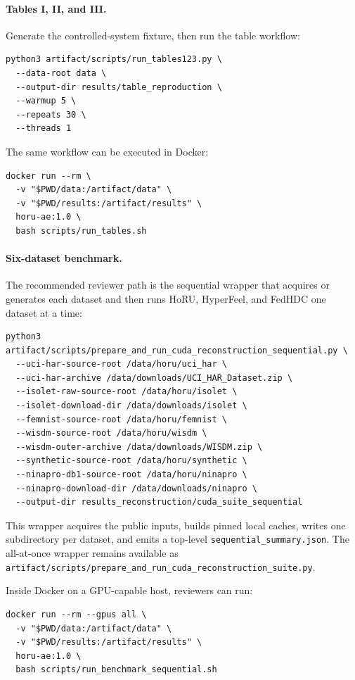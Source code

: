 \documentclass[11pt]{article}
\begin{document}
\paragraph{Tables I, II, and III.}
Generate the controlled-system fixture, then run the table workflow:

\begin{verbatim}
python3 artifact/scripts/run_tables123.py \
  --data-root data \
  --output-dir results/table_reproduction \
  --warmup 5 \
  --repeats 30 \
  --threads 1
\end{verbatim}

The same workflow can be executed in Docker:

\begin{verbatim}
docker run --rm \
  -v "$PWD/data:/artifact/data" \
  -v "$PWD/results:/artifact/results" \
  horu-ae:1.0 \
  bash scripts/run_tables.sh
\end{verbatim}

\paragraph{Six-dataset benchmark.}
The recommended reviewer path is the sequential wrapper that acquires or
generates each dataset and then runs HoRU, HyperFeel, and FedHDC one dataset
at a time:

\begin{verbatim}
python3 artifact/scripts/prepare_and_run_cuda_reconstruction_sequential.py \
  --uci-har-source-root /data/horu/uci_har \
  --uci-har-archive /data/downloads/UCI_HAR_Dataset.zip \
  --isolet-raw-source-root /data/horu/isolet \
  --isolet-download-dir /data/downloads/isolet \
  --femnist-source-root /data/horu/femnist \
  --wisdm-source-root /data/horu/wisdm \
  --wisdm-outer-archive /data/downloads/WISDM.zip \
  --synthetic-source-root /data/horu/synthetic \
  --ninapro-db1-source-root /data/horu/ninapro \
  --ninapro-download-dir /data/downloads/ninapro \
  --output-dir results_reconstruction/cuda_suite_sequential
\end{verbatim}

This wrapper acquires the public inputs, builds pinned local caches, writes one
subdirectory per dataset, and emits a top-level
\texttt{sequential\_summary.json}. The all-at-once wrapper remains available as
\texttt{artifact/scripts/prepare\_and\_run\_cuda\_reconstruction\_suite.py}.

Inside Docker on a GPU-capable host, reviewers can run:

\begin{verbatim}
docker run --rm --gpus all \
  -v "$PWD/data:/artifact/data" \
  -v "$PWD/results:/artifact/results" \
  horu-ae:1.0 \
  bash scripts/run_benchmark_sequential.sh
\end{verbatim}
\end{document}

